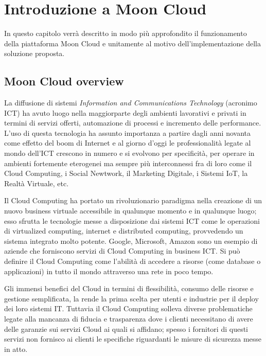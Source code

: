 \chapter{Introduzione a Moon Cloud}
\label{chp:01-introduction}
In questo capitolo verrà descritto in modo più approfondito il funzionamento della piattaforma Moon Cloud e unitamente al 
motivo dell'implementazione della soluzione proposta.

\section{Moon Cloud overview}
La diffusione di sistemi \textit{Information and Communications Technology} (acronimo ICT) ha avuto luogo nella maggiorparte degli ambienti 
lavorativi e privati in termini di servizi offerti, automazione di processi e incremento delle performance. L'uso di questa tecnologia 
ha assunto importanza a partire dagli anni novanta come effetto del boom di Internet e al giorno d'oggi le professionalità legate al
mondo dell'ICT crescono in numero e si evolvono per specificità, per operare in ambienti fortemente eterogenei ma sempre più 
interconnessi fra di loro come il Cloud Computing, i Social Newtwork, il Marketing Digitale, i Sistemi IoT, la Realtà Virtuale, etc.

Il Cloud Computing ha portato un rivoluzionario paradigma nella creazione di un nuovo business virtuale accessibile in qualunque momento
e in qualunque luogo; esso sfrutta le tecnologie messe a disposizione dai sistemi ICT come le operazioni di virtualized computing,
internet e distributed computing, provvedendo un sistema integrato molto potente. Google, Microsoft, Amazon sono un esempio di 
aziende che forniscono servizi di Cloud Computing in business ICT. Si può definire il Cloud Computing come l'abilità di accedere a 
risorse (come database o applicazioni) in tutto il mondo attraverso una rete in poco tempo.

Gli immensi benefici del Cloud in termini di flessibilità, consumo delle risorse e gestione semplificata, la rende la prima scelta per 
utenti e industrie per il deploy dei loro sistemi IT. Tuttavia il Cloud Computing solleva diverse problematiche legate alla mancanza di 
fiducia e trasparenza dove i clienti necessitano di avere delle garanzie sui servizi Cloud ai quali si affidano; spesso i fornitori di 
questi servizi non fornisco ai clienti le specifiche riguardanti le misure di sicurezza messe in atto.

